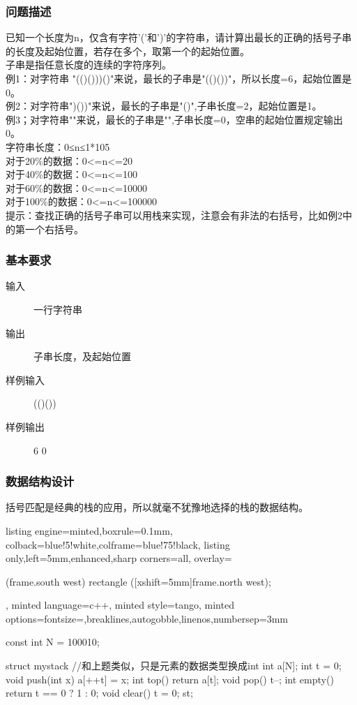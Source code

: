 \documentclass[12pt]{article}
\begin{document}
\subsubsection{问题描述}
{\songti 已知一个长度为n，仅含有字符'('和')'的字符串，请计算出最长的正确的括号子串的长度及起始位置，若存在多个，取第一个的起始位置。\\
子串是指任意长度的连续的字符序列。\\
例1：对字符串 "(()()))()"来说，最长的子串是"(()())"，所以长度=6，起始位置是0。\\
例2：对字符串")())"来说，最长的子串是"()",子串长度=2，起始位置是1。\\
例3；对字符串""来说，最长的子串是"",子串长度=0，空串的起始位置规定输出0。\\
字符串长度：0≤n≤1*105\\
对于20\%的数据：0<=n<=20\\
对于40\%的数据：0<=n<=100\\
对于60\%的数据：0<=n<=10000\\
对于100\%的数据：0<=n<=100000\\
提示：查找正确的括号子串可以用栈来实现，注意会有非法的右括号，比如例2中的第一个右括号。}
\subsubsection{基本要求}
\begin{description}
    \item[输入] 一行字符串
    \item[输出] 子串长度，及起始位置
    \item[样例输入] (()())
    \item[样例输出] 6 0
\end{description}
\subsubsection{数据结构设计}
{\songti 括号匹配是经典的栈的应用，所以就毫不犹豫地选择的栈的数据结构。}
\begin{tcblisting}{listing engine=minted,boxrule=0.1mm,
colback=blue!5!white,colframe=blue!75!black,
listing only,left=5mm,enhanced,sharp corners=all,
overlay={\begin{tcbclipinterior} (frame.south west)
rectangle ([xshift=5mm]frame.north west);\end{tcbclipinterior}},
minted language=c++,
minted style=tango,
minted options={fontsize=\small,breaklines,autogobble,linenos,numbersep=3mm}}
const int N = 100010;

struct mystack { //和上题类似，只是元素的数据类型换成int
    int a[N];
    int t = 0;
    void push(int x) { a[++t] = x; }
    int top() { return a[t]; }
    void pop() { t--; }
    int empty() { return t == 0 ? 1 : 0; }
    void clear() { t = 0; }
} st;
\end{tcblisting}
\end{document}

